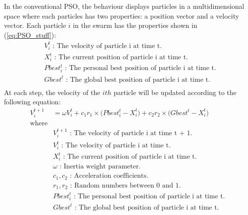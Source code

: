 \documentclass{pdfmx4020}
\begin{document}
  In the conventional PSO, the behaviour displays particles in a multidimensional space where each particles has two properties: a position vector and a velocity vector. Each particle $i$ in the swarm has the properties shown in (\ref{eq:PSO_stuff}):
    \begin{equation} \label{eq:PSO_stuff}
      \begin{split}
        & V_i^t \text{ : The velocity of particle i at time t.} \\
        & X_i^t \text{ : The current position of particle i at time t.} \\
        & Pbest_i^t \text{ : The personal best position of particle i at time t.} \\
        & Gbest^t \text{ : The global best position of particle i at time t.} \\
      \end{split}
    \end{equation}
    At each step, the velocity of the $ith$ particle will be updated according to the following equation:
    \begin{equation} \label{eq:vel}
      \begin{split}
        V_{i}^{t+1} & = \omega V_{i}^{t} + c_1 r_1 \times \Big( Pbest_{i}^{t} - X_{i}^{t} \Big) + c_2 r_2 \times \Big( Gbest^{t} - X_{i}^{t} \Big) \\
        \text{where} & \\
        & V_i^{t+1} \text{ : The velocity of particle i at time t + 1.} \\
        & V_i^t \text{ : The velocity of particle i at time t.} \\
        & X_i^t \text{ : The current position of particle i at time t.} \\
        & \omega \text{ : Inertia weight parameter.} \\
        & c_1, c_2 \text{ : Acceleration coefficients.} \\
        & r_1, r_2 \text{ : Random numbers between 0 and 1.} \\
        & Pbest_i^t \text{ : The personal best position of particle i at time t.} \\
        & Gbest^t \text{ : The global best position of particle i at time t.} \\
      \end{split}
    \end{equation}
\end{document}
